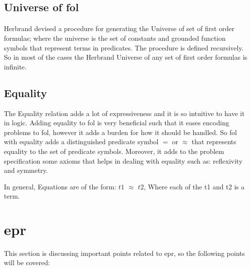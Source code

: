 \subsection{Universe of \ac{fol}}
\paragraph{}
Herbrand devised a procedure for generating the Universe of set of first order formulas; where the universe is the set of constants and grounded function symbols that represent terms in predicates. The procedure is defined recursively. So in most of the cases the Herbrand Universe of any set of first order formulas is infinite.


\subsection{Equality}
The Equality relation adds a lot of expressiveness and it is so intuitive to have it in logic. Adding equality to \ac{fol} is very beneficial such that it eases encoding problems to \ac{fol}, however it adds a burden for how it should be handled. So \ac{fol} with equality adds a distinguished predicate symbol $=$ or $\approx$ that represents equality to the set of predicate symbols. Moreover, it adds to the problem specification some axioms that helps in dealing with equality such as: reflexivity and symmetry.


In general, Equations are of the form: $t1$ $\approx$ $t2$, Where each of the t1 and t2 is a term.


\begin{comment}
One representation of Herbrand Theorem states that:
"Let F be a formula in CNF. The formula F is unsatisfiable iff there is an unsatisfiable set G containing only ground instances of clauses in F."


So this theorem reduces any \ac{fol} problem to an equivalent propositional problem. And this a very important reduction.
\end{comment}




\section{\acf{epr}}
\paragraph{}
This section is discussing important points related to \ac{epr}, so the following points will be covered:

